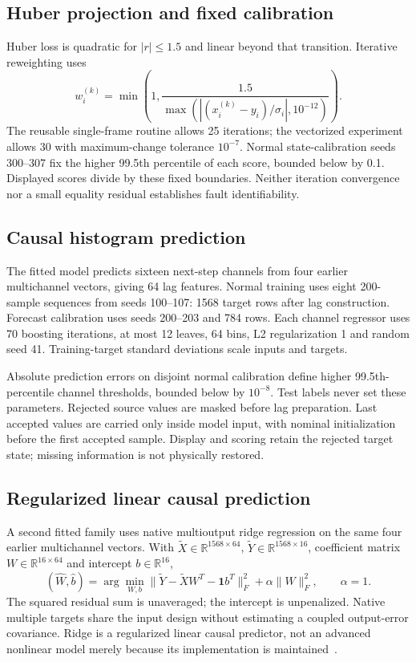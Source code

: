 \documentclass[11pt,a4paper]{article}
\begin{document}
\subsection{Huber projection and fixed calibration}
Huber loss is quadratic for $|r|\le1.5$ and linear beyond that transition. Iterative reweighting uses
\begin{equation}
 w_i^{(k)}=\min\left(1,\frac{1.5}{\max(|(x_i^{(k)}-y_i)/\sigma_i|,10^{-12})}\right).
\end{equation}
The reusable single-frame routine allows 25 iterations; the vectorized experiment allows 30 with maximum-change tolerance $10^{-7}$. Normal state-calibration seeds 300--307 fix the higher 99.5th percentile of each score, bounded below by 0.1. Displayed scores divide by these fixed boundaries. Neither iteration convergence nor a small equality residual establishes fault identifiability.

\subsection{Causal histogram prediction}
The fitted model predicts sixteen next-step channels from four earlier multichannel vectors, giving 64 lag features. Normal training uses eight 200-sample sequences from seeds 100--107: 1568 target rows after lag construction. Forecast calibration uses seeds 200--203 and 784 rows. Each channel regressor uses 70 boosting iterations, at most 12 leaves, 64 bins, L2 regularization 1 and random seed 41. Training-target standard deviations scale inputs and targets.

Absolute prediction errors on disjoint normal calibration define higher 99.5th-percentile channel thresholds, bounded below by $10^{-8}$. Test labels never set these parameters. Rejected source values are masked before lag preparation. Last accepted values are carried only inside model input, with nominal initialization before the first accepted sample. Display and scoring retain the rejected target state; missing information is not physically restored.

\subsection{Regularized linear causal prediction}
A second fitted family uses native multioutput ridge regression on the same four earlier multichannel vectors. With $\tilde X\in\mathbb R^{1568\times64}$, $\tilde Y\in\mathbb R^{1568\times16}$, coefficient matrix $W\in\mathbb R^{16\times64}$ and intercept $b\in\mathbb R^{16}$,
\begin{equation}
 (\widehat W,\widehat b)=\arg\min_{W,b}\|\tilde Y-\tilde XW^T-\mathbf1b^T\|_F^2+\alpha\|W\|_F^2,\qquad\alpha=1.
\end{equation}
The squared residual sum is unaveraged; the intercept is unpenalized. Native multiple targets share the input design without estimating a coupled output-error covariance. Ridge is a regularized linear causal predictor, not an advanced nonlinear model merely because its implementation is maintained~\cite{ridge}.
\end{document}
